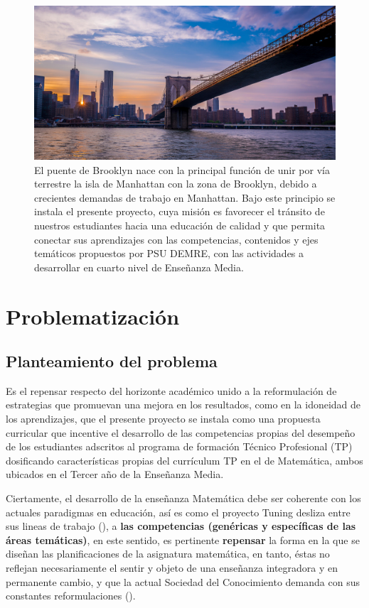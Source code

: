 \documentclass[12pt,letterpaper,article,x11names]{memoir}
\begin{document}
\begin{figure}[htbp]
\centering
\includegraphics[width=.9\linewidth]{brooklyn.jpg}
\caption{\label{fig:org5cfa49c}
El puente de Brooklyn nace con la principal función de unir por vía terrestre la isla de Manhattan con la zona de Brooklyn, debido a crecientes demandas de trabajo en Manhattan. Bajo este principio se instala el presente proyecto, cuya misión es favorecer el tránsito de nuestros estudiantes hacia una educación de calidad y que permita conectar sus aprendizajes con las competencias, contenidos y ejes temáticos propuestos por PSU DEMRE, con las actividades a desarrollar en cuarto nivel de Enseñanza Media.}
\end{figure}


\setcounter{tocdepth}{3}
\tableofcontents

\chapter{Problematización}
\label{sec:org0abee6d}
\section{Planteamiento del problema}
\label{sec:org460a416}
Es el repensar respecto del horizonte académico unido a la reformulación de estrategias que promuevan una mejora en los resultados, como en la idoneidad de los aprendizajes, que el presente proyecto se instala como una propuesta curricular que incentive el desarrollo de las competencias propias del desempeño de los estudiantes adscritos al programa de formación Técnico Profesional (TP) dosificando características propias del currículum TP en el de Matemática, ambos ubicados en el Tercer año de la Enseñanza Media.

Ciertamente, el desarrollo de la enseñanza Matemática debe ser coherente con los actuales paradigmas en educación, así es como el proyecto Tuning desliza entre sus lineas de trabajo (\citeauthor{gonzalez2004contribucion}), a \textbf{las competencias (genéricas y específicas de las áreas temáticas)}, en este sentido, es pertinente \textbf{repensar} la forma en la que se diseñan las planificaciones de la asignatura matemática, en tanto, éstas no reflejan necesariamente el sentir y objeto de una enseñanza integradora y en permanente cambio, y que la actual Sociedad del Conocimiento demanda con sus constantes reformulaciones (\citeauthor{gonzalez2004contribucion}).
\end{document}
